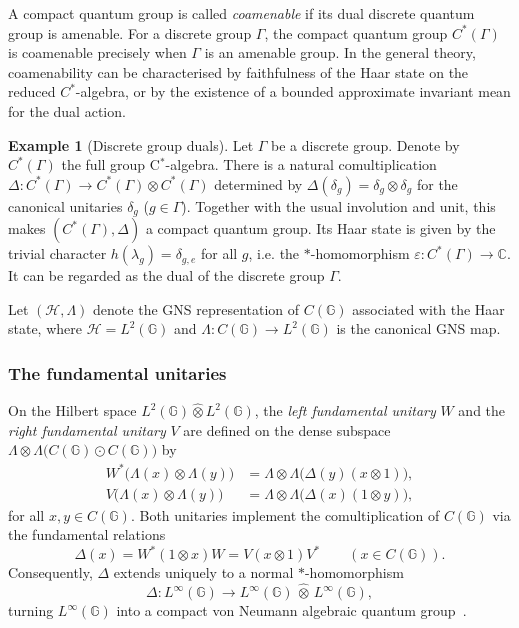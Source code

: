 \documentclass[12pt, reqno]{amsart}
\theoremstyle{definition}
\newtheorem{example}[theorem]{Example}
\theoremstyle{remark}
\numberwithin{equation}{section}
\begin{document}
A compact quantum group is called \emph{coamenable} if its dual discrete 
quantum group is amenable. For a discrete group $\Gamma$, the compact 
quantum group $C^*(\Gamma)$ is coamenable precisely when $\Gamma$ is an 
amenable group. In the general theory, coamenability can be characterised 
by faithfulness of the Haar state on the reduced $C^*$-algebra, or by the 
existence of a bounded approximate invariant mean for the dual action.

\begin{example}[Discrete group duals]
Let \(\Gamma\) be a discrete group. Denote by \(C^*(\Gamma)\) the full group C$^*$-algebra. There is a natural comultiplication \(\Delta : C^*(\Gamma) \to C^*(\Gamma) \otimes C^*(\Gamma)\) determined by \(\Delta(\delta_g) = \delta_g \otimes \delta_g\) for the canonical unitaries \(\delta_g\) (\(g \in \Gamma\)). Together with the usual involution and unit, this makes \((C^*(\Gamma), \Delta)\) a compact quantum group. Its Haar state is given by the trivial character \(h(\lambda_g) = \delta_{g,e}\) for all \(g\), i.e. the \(*\)-homomorphism \(\varepsilon : C^*(\Gamma) \to \mathbb{C}\). It can be regarded as the dual of the discrete group \(\Gamma\).
\end{example}

Let $(\mathcal{H},\Lambda)$ denote the GNS representation of $C(\mathbb{G})$ 
associated with the Haar state, where $\mathcal{H}=L^{2}(\mathbb{G})$ and 
$\Lambda:C(\mathbb{G})\to L^{2}(\mathbb{G})$ is the canonical GNS map.

\subsubsection{The fundamental unitaries}
\label{subsubsec:fundamental_unitaries}

On the Hilbert space $L^{2}(\mathbb{G})\hat{\otimes}L^{2}(\mathbb{G})$, 
the \emph{left fundamental unitary} $W$ and the \emph{right fundamental 
unitary} $V$ are defined on the dense subspace 
$\Lambda\otimes\Lambda\bigl(C(\mathbb{G})\odot C(\mathbb{G})\bigr)$ by
\begin{align*}
    W^{*}\bigl(\Lambda(x)\otimes\Lambda(y)\bigr) 
      &= \Lambda\otimes\Lambda\bigl(\Delta(y)(x\otimes 1)\bigr), \\
    V\bigl(\Lambda(x)\otimes\Lambda(y)\bigr) 
      &= \Lambda\otimes\Lambda\bigl(\Delta(x)(1\otimes y)\bigr),
\end{align*}
for all $x,y\in C(\mathbb{G})$. Both unitaries implement the comultiplication 
of $C(\mathbb{G})$ via the fundamental relations
\begin{equation}
    \Delta(x) = W^{*}(1\otimes x)W = V(x\otimes 1)V^{*} 
    \qquad (x\in C(\mathbb{G})). \tag{2.3}
\end{equation}
Consequently, $\Delta$ extends uniquely to a normal $*$-homomorphism
\[
\Delta\colon L^{\infty}(\mathbb{G}) \longrightarrow 
L^{\infty}(\mathbb{G})\,\hat{\otimes}\,L^{\infty}(\mathbb{G}),
\]
turning $L^{\infty}(\mathbb{G})$ into a compact von Neumann algebraic quantum 
group~\cite{12,26}.
\end{document}
